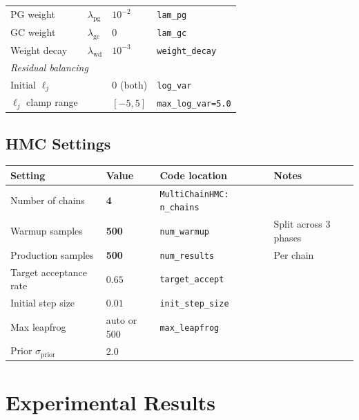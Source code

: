 \documentclass[11pt,a4paper]{article}
\theoremstyle{definition}
\newcommand{\code}[1]{\texttt{\color{codecolor}#1}}
\begin{document}
\begin{center}
\begin{tabular}{llll}
			PG weight & $\lambda_{\mathrm{pg}}$ & $10^{-2}$ & \code{lam\_pg} \\
			GC weight & $\lambda_{\mathrm{gc}}$ & 0 & \code{lam\_gc} \\
			Weight decay & $\lambda_{\mathrm{wd}}$ & $10^{-3}$ & \code{weight\_decay} \\
			\midrule
			\multicolumn{4}{l}{\textit{Residual balancing}} \\
			Initial $\ell_j$ & & $0$ (both) & \code{log\_var} \\
			$\ell_j$ clamp range & & $[-5, 5]$ & \code{max\_log\_var=5.0} \\
			\bottomrule
		\end{tabular}
	\end{center}
	
	\subsection{HMC Settings}
	\label{sec:hmc_settings}
	
	\begin{center}
		\begin{tabular}{llll}
			\toprule
			Setting & Value & Code location & Notes \\
			\midrule
			Number of chains & \textbf{4} & \code{MultiChainHMC: n\_chains} & \\
			Warmup samples & \textbf{500} & \code{num\_warmup} & Split across 3 phases \\
			Production samples & \textbf{500} & \code{num\_results} & Per chain \\
			Target acceptance rate & $0.65$ & \code{target\_accept} & \\
			Initial step size & $0.01$ & \code{init\_step\_size} & \\
			Max leapfrog & auto or 500 & \code{max\_leapfrog} & \\
			Prior $\sigma_{\mathrm{prior}}$ & 2.0 & & \\
			\bottomrule
		\end{tabular}
	\end{center}
	
	
	\section{Experimental Results}
	\label{sec:experiments}
	
\end{document}
